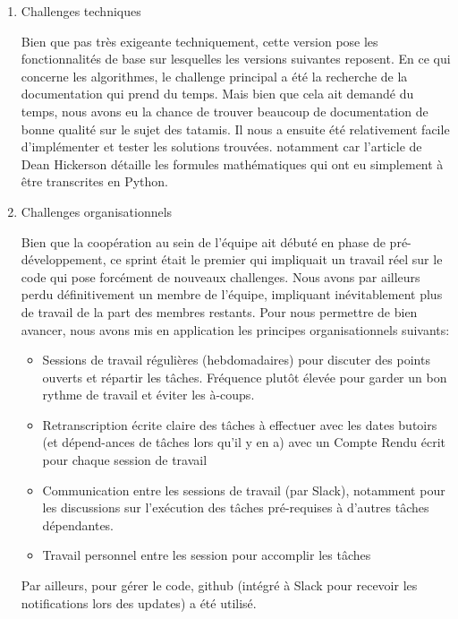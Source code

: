 \begin{enumerate}
    \item Challenges techniques

          Bien que pas très exigeante techniquement, cette version pose les fonctionnalités de base sur lesquelles
          les versions suivantes reposent. En ce qui concerne les algorithmes, le challenge principal a été la recherche
          de la documentation qui prend du temps. Mais bien que cela ait demandé du temps, nous avons eu la chance de
          trouver beaucoup de documentation de bonne qualité sur le sujet des tatamis. Il nous a ensuite été relativement
          facile d'implémenter et tester les solutions trouvées. notamment car l'article de Dean Hickerson détaille les 
          formules mathématiques qui ont eu simplement à être transcrites en Python.

    \item Challenges organisationnels

          Bien que la coopération au sein de l'équipe ait débuté en phase de pré-développement, ce sprint était le premier
          qui impliquait un travail réel sur le code qui pose forcément de nouveaux challenges. Nous avons par ailleurs perdu
          définitivement un membre de l'équipe, impliquant inévitablement plus de travail de la part des membres restants.
          Pour nous permettre de bien avancer, nous avons mis en application les principes organisationnels suivants:
          \begin{itemize}
              \item Sessions de travail régulières (hebdomadaires) pour discuter des points ouverts et répartir
                    les tâches. Fréquence plutôt élevée pour garder un bon rythme de travail et éviter les à-coups.
              \item Retranscription écrite claire des tâches à effectuer avec les dates butoirs (et dépend-ances
                    de tâches lors qu’il y en a) avec un Compte Rendu écrit pour chaque session de travail
              \item Communication entre les sessions de travail (par Slack), notamment pour les discussions sur
                    l'exécution des tâches pré-requises à d'autres tâches dépendantes.
              \item Travail personnel entre les session pour accomplir les tâches

          \end{itemize}

          Par ailleurs, pour gérer le code, github (intégré à Slack pour recevoir les notifications lors des updates)
          a été utilisé.

\end{enumerate}


